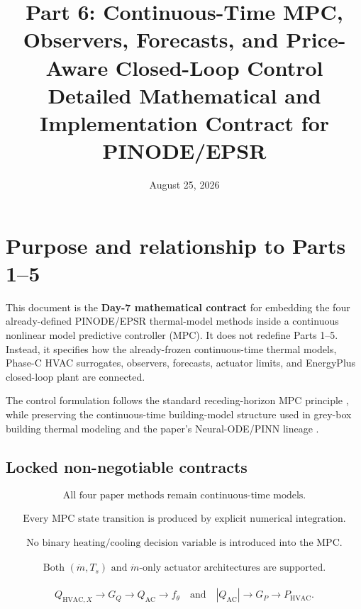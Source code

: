 \documentclass[11pt]{article}
\title{Part 6: Continuous-Time MPC, Observers, Forecasts, and Price-Aware Closed-Loop Control\\
Detailed Mathematical and Implementation Contract for PINODE/EPSR}
\author{}
\date{August 25, 2026}
\newcommand{\Ts}{T_s}
\newcommand{\mdot}{\dot m}
\newcommand{\QAC}{Q_{\mathrm{AC}}}
\newcommand{\QHX}{Q_{\mathrm{HVAC},X}}
\newcommand{\PHVAC}{P_{\mathrm{HVAC}}}
\begin{document}
\maketitle

\section*{Purpose and relationship to Parts 1--5}

This document is the \textbf{Day-7 mathematical contract} for embedding the four already-defined
PINODE/EPSR thermal-model methods inside a continuous nonlinear model predictive controller (MPC).
It does not redefine Parts 1--5.  Instead, it specifies how the already-frozen continuous-time
thermal models, Phase-C HVAC surrogates, observers, forecasts, actuator limits, and EnergyPlus
closed-loop plant are connected.

The control formulation follows the standard receding-horizon MPC principle
\citep{garcia1989mpc,rawlings2026mpc,drgona2020all,killian2016ten}, while preserving the
continuous-time building-model structure used in grey-box building thermal modeling
\citep{bacher2011heat} and the paper's Neural-ODE/PINN lineage
\citep{chen2018node,raissi2019pinn}.

\subsection*{Locked non-negotiable contracts}

\begin{align}
\boxed{\text{All four paper methods remain continuous-time models.}}
\end{align}

\begin{align}
\boxed{\text{Every MPC state transition is produced by explicit numerical integration.}}
\end{align}

\begin{align}
\boxed{\text{No binary heating/cooling decision variable is introduced into the MPC.}}
\end{align}

\begin{align}
\boxed{\text{Both }(\mdot,\Ts)\text{ and }\mdot\text{-only actuator architectures are supported.}}
\end{align}

\begin{align}
\boxed{\QHX\rightarrow G_Q\rightarrow\QAC\rightarrow f_\theta
\quad\text{and}\quad
|\QAC|\rightarrow G_P\rightarrow\PHVAC.}
\end{align}
\end{document}
